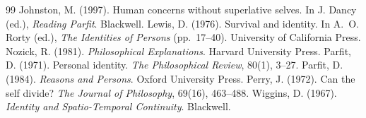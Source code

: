 \documentclass{situationist-preprint}
\begin{document}
\begin{thebibliography}{99}\small
{} Johnston, M. (1997). Human concerns without superlative selves. In J. Dancy (ed.), \emph{Reading Parfit}. Blackwell.
 Lewis, D. (1976). Survival and identity. In A.~O. Rorty (ed.), \emph{The Identities of Persons} (pp.~17--40). University of California Press.
 Nozick, R. (1981). \emph{Philosophical Explanations}. Harvard University Press.
 Parfit, D. (1971). Personal identity. \emph{The Philosophical Review}, 80(1), 3--27.
 Parfit, D. (1984). \emph{Reasons and Persons}. Oxford University Press.
 Perry, J. (1972). Can the self divide? \emph{The Journal of Philosophy}, 69(16), 463--488.
 Wiggins, D. (1967). \emph{Identity and Spatio-Temporal Continuity}. Blackwell.
\end{thebibliography}
\end{document}
